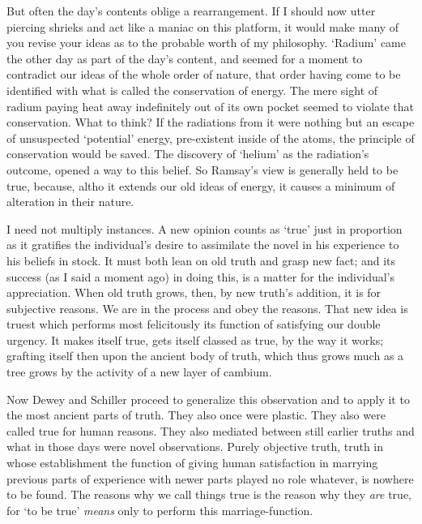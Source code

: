 \documentclass[]{article}
\begin{document}
But often the day's contents oblige a rearrangement. If I should now
utter piercing shrieks and act like a maniac on this platform, it
would make many of you revise your ideas as to the probable worth of my
philosophy. `Radium' came the other day as part of the day's content,
and seemed for a moment to contradict our ideas of the whole order of
nature, that order having come to be identified with what is called
the conservation of energy. The mere sight of radium paying heat away
indefinitely out of its own pocket seemed to violate that conservation.
What to think? If the radiations from it were nothing but an escape of
unsuspected `potential' energy, pre-existent inside of the atoms, the
principle of conservation would be saved. The discovery of `helium' as
the radiation's outcome, opened a way to this belief. So Ramsay's view
is generally held to be true, because, altho it extends our old ideas of
energy, it causes a minimum of alteration in their nature.

I need not multiply instances. A new opinion counts as `true' just in
proportion as it gratifies the individual's desire to assimilate the
novel in his experience to his beliefs in stock. It must both lean on
old truth and grasp new fact; and its success (as I said a moment ago)
in doing this, is a matter for the individual's appreciation. When
old truth grows, then, by new truth's addition, it is for subjective
reasons. We are in the process and obey the reasons. That new idea is
truest which performs most felicitously its function of satisfying our
double urgency. It makes itself true, gets itself classed as true, by
the way it works; grafting itself then upon the ancient body of truth,
which thus grows much as a tree grows by the activity of a new layer of
cambium.

Now Dewey and Schiller proceed to generalize this observation and
to apply it to the most ancient parts of truth. They also once were
plastic. They also were called true for human reasons. They also
mediated between still earlier truths and what in those days were novel
observations. Purely objective truth, truth in whose establishment the
function of giving human satisfaction in marrying previous parts of
experience with newer parts played no role whatever, is nowhere to be
found. The reasons why we call things true is the reason why they \emph{are}
true, for `to be true' \emph{means} only to perform this marriage-function.
\end{document}
